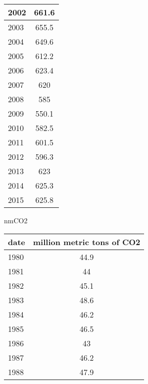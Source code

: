 \documentclass{mcmthesis}
\begin{document}
\begin{appendices}
\begin{minipage}{\textwidth}
\begin{minipage}[t]{0.45\textwidth}
\begin{tabular}{|l|c|}
        2002 & 661.6                      \\ \hline
        2003 & 655.5                      \\ \hline
        2004 & 649.6                      \\ \hline
        2005 & 612.2                      \\ \hline
        2006 & 623.4                      \\ \hline
        2007 & 620                        \\ \hline
        2008 & 585                        \\ \hline
        2009 & 550.1                      \\ \hline
        2010 & 582.5                      \\ \hline
        2011 & 601.5                      \\ \hline
        2012 & 596.3                      \\ \hline
        2013 & 623                        \\ \hline
        2014 & 625.3                      \\ \hline
        2015 & 625.8                      \\ \hline
        \end{tabular}
    \end{minipage}
    \begin{minipage}[t]{0.45\textwidth}
    \centering
          \makeatletter{}\makeatother\caption{nmCO2}
          \begin{tabular}{|l|c|}
            \hline
            date & million metric tons of CO2 \\ \hline
            1980 & 44.9                       \\ \hline
            1981 & 44                         \\ \hline
            1982 & 45.1                       \\ \hline
            1983 & 48.6                       \\ \hline
            1984 & 46.2                       \\ \hline
            1985 & 46.5                       \\ \hline
            1986 & 43                         \\ \hline
            1987 & 46.2                       \\ \hline
            1988 & 47.9                       \\ \hline

\end{tabular}
\end{minipage}
\end{minipage}
\end{appendices}
\end{document}
